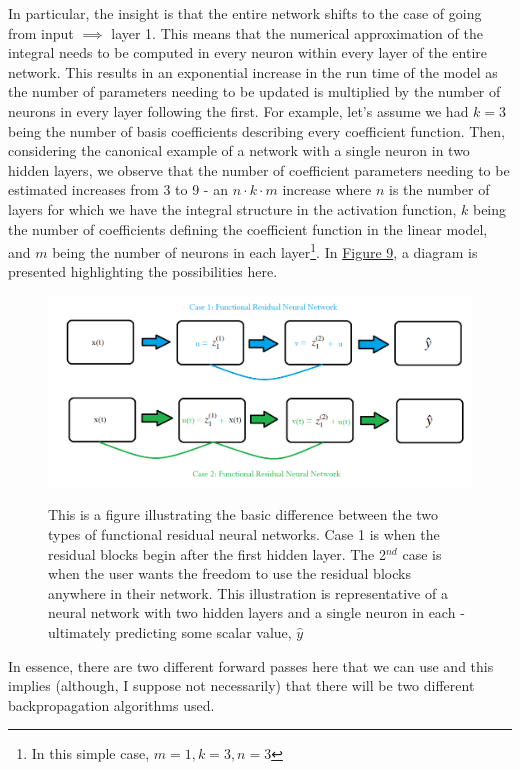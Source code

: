 \documentclass{article}
\begin{document}
\noindent In particular, the insight is that the entire network shifts to the case of going from input $\implies$ layer 1. This means that the numerical approximation of the integral needs to be computed in every neuron within every layer of the entire network. This results in an exponential increase in the run time of the model as the number of parameters needing to be updated is multiplied by the number of neurons in every layer following the first. For example, let's assume we had $k = 3$ being the number of basis coefficients describing every coefficient function. Then, considering the canonical example of a network with a single neuron in two hidden layers, we observe that the number of coefficient parameters needing to be estimated increases from 3 to 9 - an $n\cdot k\cdot m$ increase where $n$ is the number of layers for which we have the integral structure in the activation function, $k$ being the number of coefficients defining the coefficient function in the linear model, and $m$ being the number of neurons in each layer\footnote{In this simple case, $m = 1, k = 3, n = 3$}. In \hyperref[fig:flowChartFuncResNN]{Figure 9}, a diagram is presented highlighting the possibilities here.

\begin{figure}[h!]
  \centering
  \includegraphics[scale = 0.5]{funcResNN.png}
  \label{fig:flowChartFuncResNN}
  \caption{This is a figure illustrating the basic difference between the two types of functional residual neural networks. Case 1 is when the residual blocks begin after the first hidden layer. The 2$^{nd}$ case is when the user wants the freedom to use the residual blocks anywhere in their network. This illustration is representative of a neural network with two hidden layers and a single neuron in each - ultimately predicting some scalar value, $\hat{y}$}
\end{figure}

\noindent In essence, there are two different forward passes here that we can use and this implies (although, I suppose not necessarily) that there will be two different backpropagation algorithms used.
\end{document}

